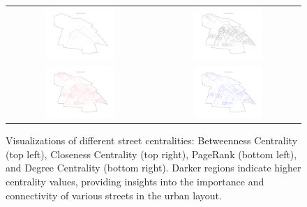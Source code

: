 \begin{figure}
    \centering
    \begin{tabular}{cc}
         \includegraphics[width=0.5\textwidth]{figures/Adri/between.png}&  \includegraphics[width=0.5\textwidth]{figures/Adri/closeness.png}\\
         \includegraphics[width=0.5\textwidth]{figures/Adri/pagerank.png}&\includegraphics[width=0.5\textwidth]{figures/Adri/degree.png} 
    \end{tabular}
    \caption{Visualizations of different street centralities: Betweenness Centrality (top left), Closeness Centrality (top right), PageRank (bottom left), and Degree Centrality (bottom right). Darker regions indicate higher centrality values, providing insights into the importance and connectivity of various streets in the urban layout.}
    \label{fig:centralities}
\end{figure}

